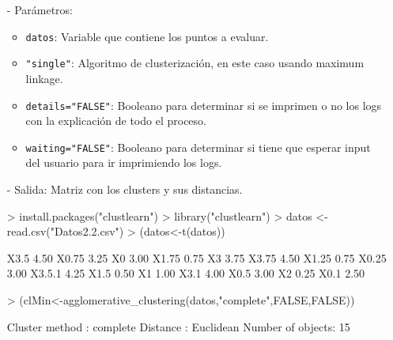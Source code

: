 \documentclass[a4paper, 12pt]{article}
\begin{document}
\begin{itemize}
		\begin{itemize}
			\item [-] Parámetros:
			\begin{itemize}
				\item \texttt{datos}: Variable que contiene los puntos a evaluar.
				\item \texttt{"single"}: Algoritmo de clusterización, en este caso usando maximum linkage.
				\item \texttt{details="FALSE"}: Booleano para determinar si se imprimen o no los logs con la explicación de todo el proceso.
				\item \texttt{waiting="FALSE"}: Booleano para determinar si tiene que esperar input del usuario para ir imprimiendo los logs.
			\end{itemize}
			\item [-] Salida: Matriz con los clusters y sus distancias.
\begin{Schunk}
\begin{Sinput}
> install.packages("clustlearn")
> library("clustlearn")
> datos <- read.csv("Datos2.2.csv")
> (datos<-t(datos))
\end{Sinput}
\begin{Soutput}
       [,1]
X3.5   4.50
X0.75  3.25
X0     3.00
X1.75  0.75
X3     3.75
X3.75  4.50
X1.25  0.75
X0.25  3.00
X3.5.1 4.25
X1.5   0.50
X1     1.00
X3.1   4.00
X0.5   3.00
X2     0.25
X0.1   2.50
\end{Soutput}
\begin{Sinput}
> (clMin<-agglomerative_clustering(datos,"complete",FALSE,FALSE))
\end{Sinput}
\begin{Soutput}
Cluster method   : complete 
Distance         : Euclidean 
Number of objects: 15 
\end{Soutput}
\end{Schunk}
		\end{itemize}


\end{itemize}
\end{document}
